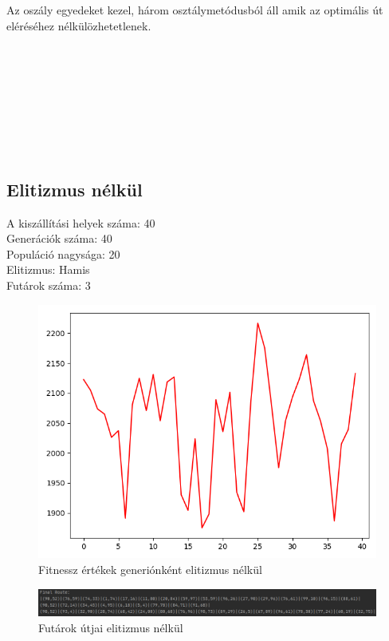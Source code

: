 Az oszály egyedeket kezel, három osztálymetódusból áll amik az optimális út eléréséhez nélkülözhetetlenek.

\\\
\\\
\\\
\\\
\\\
\\\


\subsection{
Elitizmus nélkül
}

A kiszállítási helyek száma: 40\\
Generációk száma: 40\\
Populáció nagysága: 20\\
Elitizmus: Hamis\\
Futárok száma: 3\\

\begin{figure}[!htb]
\centering
\includegraphics[scale=0.7]{images/MTSPMultiDepo1.png}
\caption{Fitnessz értékek generiónként elitizmus nélkül}
\label{fig:MTSPMultiDepo1}
\end{figure}

\begin{figure}[!htb]
\centering
\includegraphics[width=\textwidth]{images/MTSPMultiDepo1Route.png}
\caption{Futárok útjai elitizmus nélkül}
\label{fig:MTSPMultiDepo1Route}
\end{figure}

